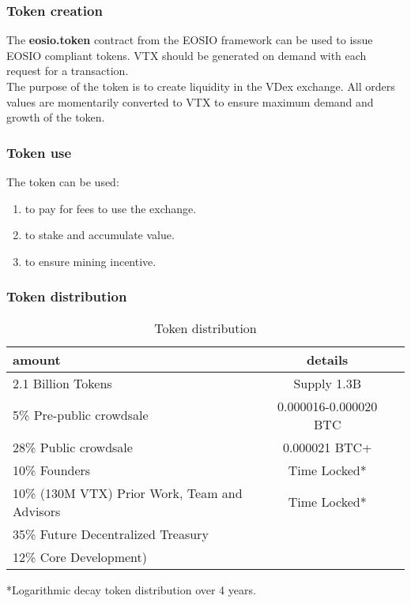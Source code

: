 \documentclass[]{article}
\begin{document}
\subsubsection{Token creation}
The \textbf{eosio.token} contract from the EOSIO framework can be used to issue EOSIO compliant tokens. VTX should be generated on demand with each request for a transaction. \\
The purpose of the token is to create liquidity in the VDex exchange.
All orders values are momentarily converted to VTX to ensure maximum demand and growth of the token.\\ 

\subsubsection{Token use}

The token can be used:
\begin{enumerate}
\item to pay for fees to use the exchange.
\item to stake and accumulate value.
\item to ensure mining incentive.
\end{enumerate}
 
\subsubsection{Token distribution}	
\begin{table}[h!]
	\begin{center}
		\caption{Token distribution}
		\label{tab:table1}
		\begin{tabular}{l|c|r}
			\textbf{amount} & \textbf{details} \\
			\hline
			2.1 Billion Tokens & Supply 1.3B \\
			\hline
			\hline
			5\%  Pre-public crowdsale & 0.000016-0.000020 BTC \\
			\hline
			28\% Public crowdsale & 0.000021 BTC+ \\
			\hline
			10\% Founders & Time Locked*\\
			\hline
			10\% (130M VTX) Prior Work, Team and Advisors & Time Locked*\\
			\hline
			35\% Future Decentralized Treasury\\
			\hline
			12\% Core Development)\\
			\hline				
		\end{tabular}
	\end{center}

*Logarithmic decay token distribution over 4 years.\\
\end{table}
\end{document}
